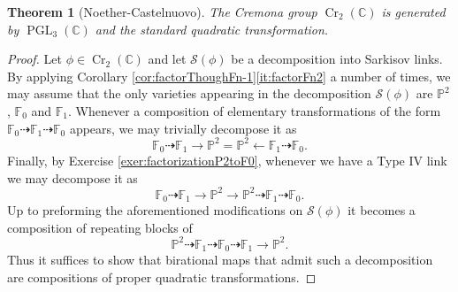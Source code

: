 \documentclass[a4paper,11pt]{amsart}
\newtheorem{theorem}{Theorem}[section]
\def\PGL{\operatorname{PGL}}
\def\Cr{\operatorname{Cr}}
\newcommand{\CC}{\mathbb{C}}
\newcommand{\PP}{\mathbb{P}}
\renewcommand{\FF}{\mathbb{F}}
\newcommand{\rmap}{\dashrightarrow}
\begin{document}
\begin{theorem}[Noether-Castelnuovo]
	The Cremona group $\Cr_2(\CC)$ is generated by $\PGL_3(\CC)$ and the standard quadratic transformation.
\end{theorem}

\begin{proof}
	Let $\phi \in \Cr_2(\CC)$ and let $\mathcal{S}(\phi)$ be a decomposition into Sarkisov links.
	By applying Corollary \ref{cor:factorThoughFn-1}\eqref{it:factorFn2} a number of times, we may assume that the only varieties appearing in the decomposition $\mathcal{S}(\phi)$ are $\PP^2$, $\FF_0$ and $\FF_1$.
	Whenever a composition of elementary transformations of the form $\FF_0 \rmap \FF_1 \rmap \FF_0$ appears, we may trivially decompose it as
	\[
	\FF_0 \rmap \FF_1 \to \PP^2 = \PP^2 \leftarrow \FF_1 \rmap \FF_0.
	\]  
	Finally, by Exercise \ref{exer:factorizationP2toF0}, whenever we have a Type IV link we may decompose it as
	\[
	\FF_0 \rmap \FF_1 \to \PP^2 \to \PP^2 \rmap \FF_1 \rmap \FF_0.
	\]	
	Up to preforming the aforementioned modifications on $\mathcal{S}(\phi)$ it becomes a composition of repeating blocks of
	\begin{equation}\label{eq:almostSTD}\tag{$Q$}
	\PP^2 \rmap \FF_1 \rmap \FF_0 \rmap \FF_1 \to \PP^2.
	\end{equation}
	Thus it suffices to show that birational maps that admit such a decomposition are compositions of proper quadratic transformations.
	

\end{proof}
\end{document}
